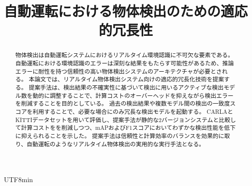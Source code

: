 \documentclass[conference, dvipdfmx]{IEEEtran}
\begin{document}
\begin{CJK}{UTF8}{min}

\title{自動運転における物体検出のための適応的冗長性}

\author{
\and
{}
}

\maketitle

%


\begin{abstract}
物体検出は自動運転システムにおけるリアルタイム環境認識に不可欠な要素である。
自動運転における環境認識のエラーは深刻な結果をもたらす可能性があるため、推論エラーに耐性を持つ信頼性の高い物体検出システムのアーキテクチャが必要とされる。
本論文では、リアルタイム物体検出システム向けの適応的冗長化技術を提案する。
提案手法は、検出結果の不確実性に基づいて検出に用いるアクティブな検出モデル数を動的に調整することで、計算コストのオーバーヘッドを抑えながら検出エラーを削減することを目的としている。
過去の検出結果や複数モデル間の検出の一致度スコアを利用することで、必要な場合にのみ冗長な検出モデルを起動する。
CARLAとKITTIデータセットを用いて評価し、提案手法が静的な2バージョンシステムと比較して計算コストをを削減しつつ、mAPおよびF1スコアにおいてわずかな検出性能を低下に抑えられることを示した。
提案手法は信頼性と計算効率のバランスを効果的に取り、自動運転のようなリアルタイム物体検出の実用的な実行手法となる。
\end{abstract}


\end{CJK}
\end{document}
